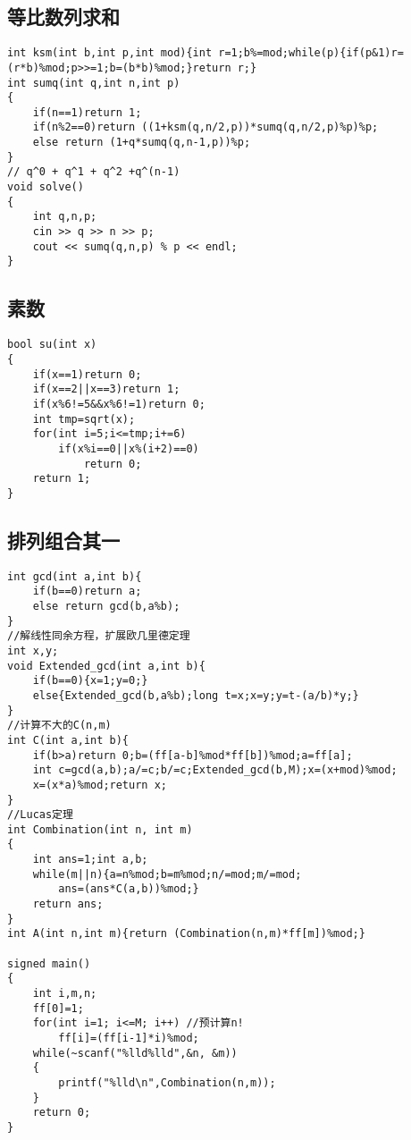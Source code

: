 \documentclass[12pt, a4paper, oneside]{ctexart}
\begin{document}
\subsection{等比数列求和} 
\begin{lstlisting}
int ksm(int b,int p,int mod){int r=1;b%=mod;while(p){if(p&1)r=(r*b)%mod;p>>=1;b=(b*b)%mod;}return r;}
int sumq(int q,int n,int p)
{
	if(n==1)return 1;
	if(n%2==0)return ((1+ksm(q,n/2,p))*sumq(q,n/2,p)%p)%p;
	else return (1+q*sumq(q,n-1,p))%p;
}
// q^0 + q^1 + q^2 +q^(n-1)
void solve()
{
	int q,n,p;
	cin >> q >> n >> p;
	cout << sumq(q,n,p) % p << endl;
}
\end{lstlisting}




\subsection{素数} 
\begin{lstlisting}
bool su(int x)
{
	if(x==1)return 0;
	if(x==2||x==3)return 1;
	if(x%6!=5&&x%6!=1)return 0;
	int tmp=sqrt(x);
	for(int i=5;i<=tmp;i+=6)
		if(x%i==0||x%(i+2)==0)
			return 0;
	return 1;
}
\end{lstlisting}




\subsection{排列组合其一} 
\begin{lstlisting}
int gcd(int a,int b){
    if(b==0)return a;
    else return gcd(b,a%b);
}
//解线性同余方程，扩展欧几里德定理
int x,y;
void Extended_gcd(int a,int b){
    if(b==0){x=1;y=0;}
    else{Extended_gcd(b,a%b);long t=x;x=y;y=t-(a/b)*y;}
}
//计算不大的C(n,m)
int C(int a,int b){
    if(b>a)return 0;b=(ff[a-b]%mod*ff[b])%mod;a=ff[a];
    int c=gcd(a,b);a/=c;b/=c;Extended_gcd(b,M);x=(x+mod)%mod;
    x=(x*a)%mod;return x;
}
//Lucas定理
int Combination(int n, int m)
{
    int ans=1;int a,b;
    while(m||n){a=n%mod;b=m%mod;n/=mod;m/=mod;
        ans=(ans*C(a,b))%mod;}
    return ans;
}
int A(int n,int m){return (Combination(n,m)*ff[m])%mod;}
 
signed main()
{
    int i,m,n;
    ff[0]=1;
    for(int i=1; i<=M; i++) //预计算n!
        ff[i]=(ff[i-1]*i)%mod;
    while(~scanf("%lld%lld",&n, &m))
    {
        printf("%lld\n",Combination(n,m));
    }
    return 0;
}

\end{lstlisting}
\end{document}
